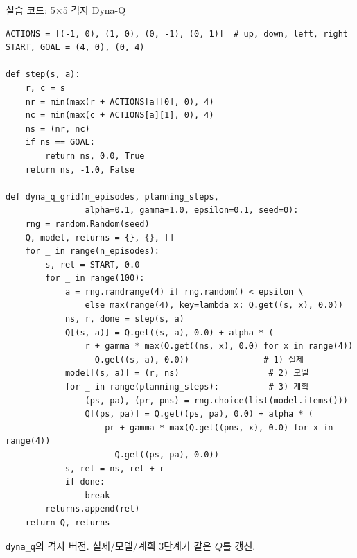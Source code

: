 \documentclass[aspectratio=169,11pt]{beamer}
\begin{document}

\begin{frame}[fragile]{실습 코드: 5$\times$5 격자 Dyna-Q}
  \begin{lstlisting}[basicstyle=\ttfamily\scriptsize]
ACTIONS = [(-1, 0), (1, 0), (0, -1), (0, 1)]  # up, down, left, right
START, GOAL = (4, 0), (0, 4)

def step(s, a):
    r, c = s
    nr = min(max(r + ACTIONS[a][0], 0), 4)
    nc = min(max(c + ACTIONS[a][1], 0), 4)
    ns = (nr, nc)
    if ns == GOAL:
        return ns, 0.0, True
    return ns, -1.0, False

def dyna_q_grid(n_episodes, planning_steps,
                alpha=0.1, gamma=1.0, epsilon=0.1, seed=0):
    rng = random.Random(seed)
    Q, model, returns = {}, {}, []
    for _ in range(n_episodes):
        s, ret = START, 0.0
        for _ in range(100):
            a = rng.randrange(4) if rng.random() < epsilon \
                else max(range(4), key=lambda x: Q.get((s, x), 0.0))
            ns, r, done = step(s, a)
            Q[(s, a)] = Q.get((s, a), 0.0) + alpha * (
                r + gamma * max(Q.get((ns, x), 0.0) for x in range(4))
                - Q.get((s, a), 0.0))               # 1) 실제
            model[(s, a)] = (r, ns)                  # 2) 모델
            for _ in range(planning_steps):          # 3) 계획
                (ps, pa), (pr, pns) = rng.choice(list(model.items()))
                Q[(ps, pa)] = Q.get((ps, pa), 0.0) + alpha * (
                    pr + gamma * max(Q.get((pns, x), 0.0) for x in range(4))
                    - Q.get((ps, pa), 0.0))
            s, ret = ns, ret + r
            if done:
                break
        returns.append(ret)
    return Q, returns
  \end{lstlisting}
  {\footnotesize \texttt{dyna\_q}의 격자 버전. 실제/모델/계획 3단계가
  같은 $Q$를 갱신.}
\end{frame}
\end{document}
